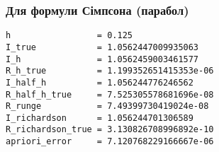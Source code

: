 \subsubsection{Для формули Сімпсона (парабол)}

\begin{verbatim}
h                 = 0.125
I_true            = 1.0562447009935063
I_h               = 1.0562459003461577
R_h_true          = 1.199352651415353e-06
I_half_h          = 1.056244776246562
R_half_h_true     = 7.525305578681696e-08
R_runge           = 7.49399730419024e-08
I_richardson      = 1.056244701306589
R_richardson_true = 3.130826708996892e-10
apriori_error     = 7.120768229166667e-06
\end{verbatim}


